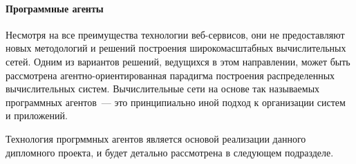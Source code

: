 \paragraph{Программные агенты}
Несмотря на все преимущества технологии веб-сервисов, они не предоставляют новых методологий и решений построения широкомасштабных вычислительных сетей. Одним из вариантов решений, ведущихся в этом направлении, может быть рассмотрена агентно-ориентированная парадигма построения распределенных вычислительных систем. Вычислительные сети на основе так называемых программных агентов~--- это принципиально иной подход к организации систем и приложений.

Технология прогрммных агентов является основой реализации данного дипломного проекта, и будет детально рассмотрена в следующем подразделе.




